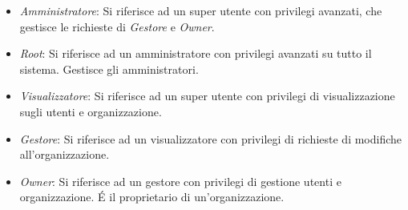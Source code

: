 \documentclass[../analisi-dei-requisiti]{subfiles}
\begin{document}
\begin{itemize}
  \item \emph{Amministratore}: Si riferisce ad un super utente con privilegi avanzati, che gestisce le richieste di \emph{Gestore} e \emph{Owner}.
  \item \emph{Root}: Si riferisce ad un amministratore con privilegi avanzati su tutto il sistema. Gestisce gli amministratori.
  \item \emph{Visualizzatore}: Si riferisce ad un super utente con privilegi di visualizzazione sugli utenti e organizzazione.
  \item \emph{Gestore}: Si riferisce ad un visualizzatore con privilegi di richieste di modifiche all'organizzazione.
  \item \emph{Owner}: Si riferisce ad un gestore con privilegi di gestione utenti e organizzazione. É il proprietario di un'organizzazione.
\end{itemize}


\end{document}

